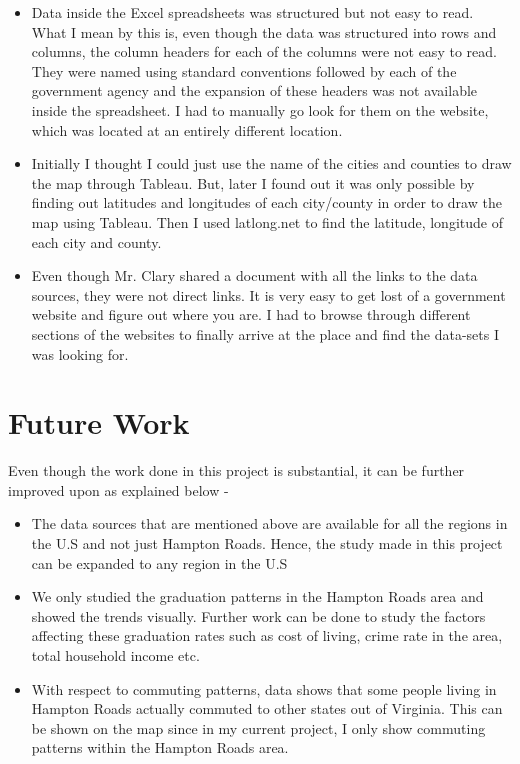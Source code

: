 \documentclass[12pt]{article}
\begin{document}
\begin{itemize}

\item Data inside the Excel spreadsheets was structured but not easy to read. What I mean by this is, even though the data was structured into rows and columns, the column headers for each of the columns were not easy to read. They were named using standard conventions followed by each of the government agency and the expansion of these headers was not available inside the spreadsheet. I had to manually go look for them on the website, which was located at an entirely different location.

\item Initially I thought I could just use the name of the cities and counties to draw the map through Tableau. But, later I found out it was only possible by finding out latitudes and longitudes of each city/county in order to draw the map using Tableau. Then I used latlong.net to find the latitude, longitude of each city and county.

\item Even though Mr. Clary shared a document with all the links to the data sources, they were not direct links. It is very easy to get lost of a government website and figure out where you are. I had to browse through different sections of the websites to finally arrive at the place and find the data-sets I was looking for. 

\end{itemize}

\newpage

\section{Future Work}

Even though the work done in this project is substantial, it can be further improved upon as explained below - 

\begin{itemize}

\item The data sources that are mentioned above are available for all the regions in the U.S and not just Hampton Roads. Hence, the study made in this project can be expanded to any region in the U.S

\item We only studied the graduation patterns in the Hampton Roads area and showed the trends visually. Further work can be done to study the factors affecting these graduation rates such as cost of living, crime rate in the area, total household income etc.

\item With respect to commuting patterns, data shows that some people living in Hampton Roads actually commuted to other states out of Virginia. This can be shown on the map since in my current project, I only show commuting patterns within the Hampton Roads area.

\end{itemize}



\end{document}
